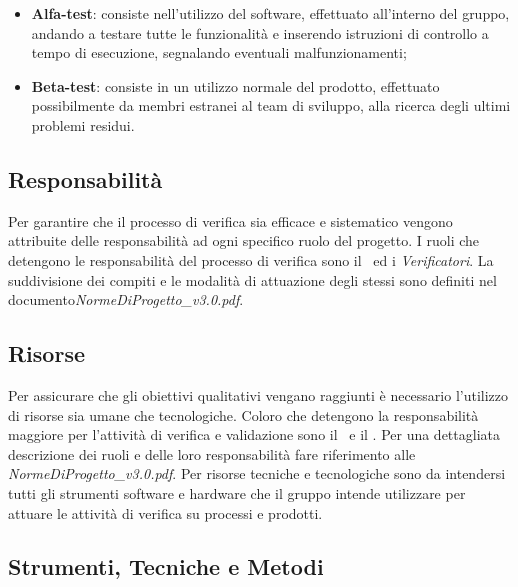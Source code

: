 \begin{itemize}
	\item \textbf{Alfa-test}: consiste nell'utilizzo del software, effettuato all'interno del gruppo, andando a testare tutte le funzionalità e inserendo istruzioni di controllo a tempo di esecuzione, segnalando eventuali malfunzionamenti;
	\item \textbf{Beta-test}: consiste in un utilizzo normale del prodotto, effettuato possibilmente da membri estranei al team di sviluppo, alla ricerca degli ultimi problemi residui.
\end{itemize}

\subsection{Responsabilità}
Per garantire che il processo di verifica sia efficace e sistematico vengono attribuite delle responsabilità ad ogni specifico ruolo del progetto. I ruoli che detengono le responsabilità del processo di verifica sono il \ruoloResponsabile\ ed i {\textit{Verificatori}}. La suddivisione dei compiti e le modalità di attuazione degli stessi sono definiti nel documento\textit{NormeDiProgetto\_v3.0.pdf}.

\subsection{Risorse}
Per assicurare che gli obiettivi qualitativi vengano raggiunti è necessario l'utilizzo di risorse sia umane che tecnologiche. Coloro che detengono la responsabilità maggiore per l'attività di verifica e validazione sono il \ruoloResponsabile\ e il \ruoloVerificatore. Per una dettagliata descrizione dei ruoli e delle loro responsabilità fare riferimento alle \textit{NormeDiProgetto\_v3.0.pdf}. Per risorse tecniche e tecnologiche sono da intendersi tutti gli strumenti software e hardware che il gruppo intende utilizzare per attuare le attività di verifica su processi e prodotti.

\subsection{Strumenti, Tecniche e Metodi}
